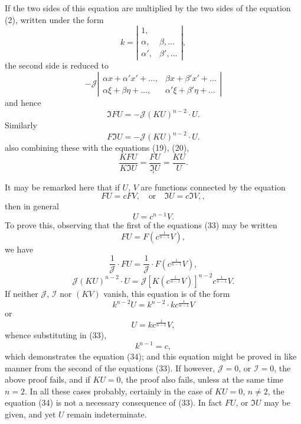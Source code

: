 \documentclass[11pt,a4paper]{article}
\theoremstyle{plain}
\theoremstyle{definition}
\theoremstyle{remark}
\begin{document}
\newpage
If the two sides of this equation are multiplied by the two sides of the equation
(2), written under the form
\[
k = \left|\begin{array}{cc}
1, & \\
\alpha, & \beta, \ldots \\
\alpha', & \beta', \ldots
\end{array}\right|
\tag{27},
\]
the second side is reduced to
\[
-\mathcal{J}
\left|\begin{array}{cc}
\alpha x + \alpha'x' + \ldots, & \beta x + \beta'x' + \ldots \\
\alpha\xi + \beta\eta + \ldots, & \alpha'\xi + \beta'\eta + \ldots
\end{array}\right|
\]
and hence
\[
\mathfrak{I}FU = -\mathcal{J}(KU)^{n-2}\cdot U
\tag{28}.
\]
Similarly
\[
F\mathfrak{I}U = -\mathcal{J}(KU)^{n-2}\cdot U
\tag{29}.
\]
also combining these with the equations (19), (20),
\[
\frac{KFU}{K\mathfrak{I}U} = \frac{FU}{\mathfrak{I}U} = \frac{KU}{U}
\tag{30}.
\]
\[
\tag{31}.
\]
\[
\tag{32}.
\]

It may be remarked here that if $U$, $V$ are functions connected by the equation
\[
FU = cFV, \quad \text{or} \quad \mathfrak{I}U = c\mathfrak{I}V, \tag{33},
\]
then in general
\[
U = c^{n-1}V \tag{34}.
\]
To prove this, observing that the first of the equations (33) may be written
\[
FU = F(c^{\frac{1}{n-1}}V) \tag{35},
\]
we have
\[
\frac{1}{\mathcal{J}} \cdot FU = \frac{1}{\mathcal{J}} \cdot F(c^{\frac{1}{n-1}}V) \tag{36},
\]
\[
\mathcal{J}(KU)^{n-2}\cdot U = \mathcal{J}[K(c^{\frac{1}{n-1}}V)]^{n-2} c^{\frac{1}{n-1}}V \tag{37}.
\]
If neither $\mathcal{J}$, $\mathcal{I}$ nor $(KV)$ vanish, this equation is of the form
\[
k^{n-2}U = k^{n-2}\cdot kc^{\frac{1}{n-1}}V
\]
or
\[
U = kc^{\frac{1}{n-1}}V \tag{38},
\]
whence substituting in (33),
\[
k^{n-1} = c \tag{39},
\]
which demonstrates the equation (34); and this equation might be proved in like
manner from the second of the equations (33). If however, $\mathcal{J} = 0$, or $\mathcal{I} = 0$, the above
proof fails, and if $KU = 0$, the proof also fails, unless at the same time $n = 2$. In all
these cases probably, certainly in the case of $KU = 0$, $n \neq 2$, the equation (34) is not
a necessary consequence of (33). In fact $FU$, or $\mathfrak{I}U$ may be given, and yet $U$
remain indeterminate.
\end{document}
